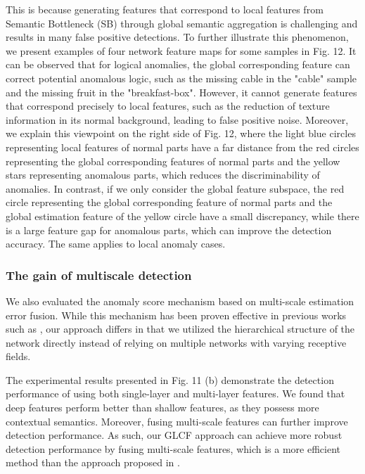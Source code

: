 \documentclass[lettersize,journal]{IEEEtran}
\begin{document}
This is because generating features that correspond to local features from Semantic Bottleneck (SB) through global semantic aggregation is challenging and results in many false positive detections. To further illustrate this phenomenon, we present examples of four network feature maps for some samples in Fig. 12. It can be observed that for logical anomalies, the global corresponding feature can correct potential anomalous logic, such as the missing cable in the "cable" sample and the missing fruit in the "breakfast-box". However, it cannot generate features that correspond precisely to local features, such as the reduction of texture information in its normal background, leading to false positive noise. Moreover, we explain this viewpoint on the right side of Fig. 12, where the light blue circles representing local features of normal parts have a far distance from the red circles representing the global corresponding features of normal parts and the yellow stars representing anomalous parts, which reduces the discriminability of anomalies. In contrast, if we only consider the global feature subspace, the red circle representing the global corresponding feature of normal parts and the global estimation feature of the yellow circle have a small discrepancy, while there is a large feature gap for anomalous parts, which can improve the detection accuracy. The same applies to local anomaly cases.


\subsubsection{The gain of multiscale detection}



We also evaluated the anomaly score mechanism based on multi-scale estimation error fusion. While this mechanism has been proven effective in previous works such as \cite{r31}, our approach differs in that we utilized the hierarchical structure of the network directly instead of relying on multiple networks with varying receptive fields.

The experimental results presented in Fig. 11 (b) demonstrate the detection performance of using both single-layer and multi-layer features. We found that deep features perform better than shallow features, as they possess more contextual semantics. Moreover, fusing multi-scale features can further improve detection performance. As such, our GLCF approach can achieve more robust detection performance by fusing multi-scale features, which is a more efficient method than the approach proposed in \cite{r31}.
\end{document}
